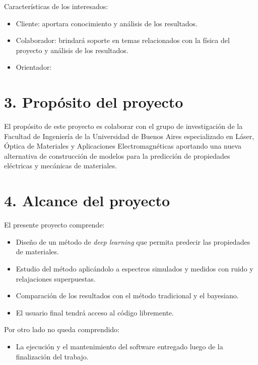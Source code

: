 \documentclass[
11pt, %
codirector, %
]{charter}
\begin{document}
Características de los interesados:

\begin{itemize}
	\item Cliente: aportara conocimiento y análisis de los resultados.
	\item Colaborador: brindará soporte en temas relacionados con la física del proyecto y análisis de los resultados.
	\item Orientador: 
\end{itemize}



\section{3. Propósito del proyecto}
\label{sec:proposito}

El propósito de este proyecto es colaborar con el grupo de investigación de la Facultad 
de Ingeniería de la Universidad de Buenos Aires especializado en Láser, Óptica de Materiales 
y Aplicaciones Electromagnéticas aportando una nueva alternativa de construcción de modelos 
para la predicción de propiedades eléctricas y mecánicas de materiales.

\section{4. Alcance del proyecto}
\label{sec:alcance}

El presente proyecto comprende:

\begin{itemize}
	\item Diseño de un método de \textit{deep learning} que permita predecir las propiedades de materiales.
	\item Estudio del método aplicándolo a espectros simulados y medidos con ruido y relajaciones superpuestas.
	\item Comparación de los resultados con el método tradicional y el bayesiano.
	\item El usuario final tendrá acceso al código libremente.
\end{itemize}


Por otro lado no queda comprendido:

\begin{itemize}
	\item La ejecución y el mantenimiento del software entregado luego de la finalización del trabajo.
\end{itemize}
\end{document}
